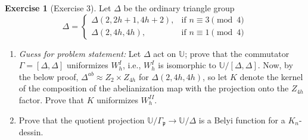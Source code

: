 \documentclass[reqno]{amsart}
\theoremstyle{definition}
\newtheorem{exercise}[theorem]{Exercise}
\theoremstyle{remark}
\begin{document}
\begin{exercise}[Exercise 3]
    Let $\Delta$ be the ordinary triangle group
    \[ \Delta = 
    \begin{cases}
        \Delta (2, 2h+1, 4h+2),& \text{if } n \equiv 3 \pmod{4}\\
        \Delta (2,4h,4h),& \text{if } n\equiv 1  \pmod{4}
    \end{cases}
    \]
      \begin{enumerate}
        \item \textit{Guess for problem statement:} 
        Let $\Delta$ act on 
        $\mathbb{U}$; prove that the
        commutator $\Gamma = 
        \left[\Delta , \Delta \right]$ uniformizes 
        $W_h^I$, i.e.,
        $W_h^I$ is isomorphic to
        $\mathbb{U}/ \left[\Delta, \Delta \right]$.
        Now, by the below proof, $\Delta^{ab}
        \approx Z_2 \times Z_{4h}$ for $\Delta (2,4h,4h)$,
        so let $K$ denote the kernel of the composition
        of the abelianization map with the projection
        onto the $Z_{4h}$ factor. Prove
        that $K$ uniformizes $W_h^{II}$.
        \item Prove that the quotient
        projection
        $\mathbb{U}/ \Gamma_{\mathfrak{p}} \to
        \mathbb{U}/ \Delta$ is a 
        Belyi function for a
        $K_n$-dessin.
    \end{enumerate}
\end{exercise}
\end{document}
